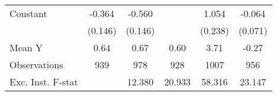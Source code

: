 {\begin{tabular}{l*{5}{c}}
\addlinespace
Constant            &      -0.364\sym{**} &      -0.560\sym{***}&                     &       1.054\sym{***}&      -0.064         \\
                    &     (0.146)         &     (0.146)         &                     &     (0.238)         &     (0.071)         \\
\midrule
Mean Y              &        0.64         &        0.67         &        0.60         &        3.71         &       -0.27         \\
Observations        &         939         &         978         &         928         &        1007         &         956         \\
Exc. Inst. F-stat   &                     &      12.380         &      20.933         &      58.316         &      23.147         \\
\bottomrule
\end{tabular}
}
